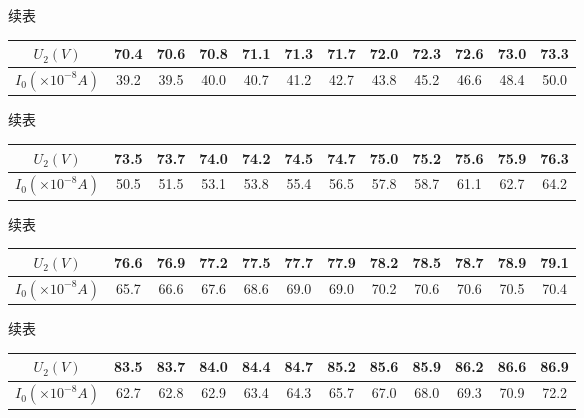 \documentclass{article}
\begin{document}
    续表

    \begin{center}
        \begin{tabular}{|c|c|c|c|c|c|c|c|c|c|c|c|}
            \hline
            $U_2(V)$ & 70.4  & 70.6  & 70.8  & 71.1  & 71.3  & 71.7  & 72.0  & 72.3  & 72.6  & 73.0  & 73.3  \bigstrut\\
            \hline
            $I_0(\times 10^{-8}A)$ & 39.2  & 39.5  & 40.0  & 40.7  & 41.2  & 42.7  & 43.8  & 45.2  & 46.6  & 48.4  & 50.0  \bigstrut\\
            \hline
        \end{tabular}%
    \end{center}

    续表

    \begin{center}
        \begin{tabular}{|c|c|c|c|c|c|c|c|c|c|c|c|}
            \hline
            $U_2(V)$ & 73.5  & 73.7  & 74.0  & 74.2  & 74.5  & 74.7  & 75.0  & 75.2  & 75.6  & 75.9  & 76.3  \bigstrut\\
            \hline
            $I_0(\times 10^{-8}A)$ & 50.5  & 51.5  & 53.1  & 53.8  & 55.4  & 56.5  & 57.8  & 58.7  & 61.1  & 62.7  & 64.2  \bigstrut\\
            \hline
        \end{tabular}%
    \end{center}

    续表

    \begin{center}
        \begin{tabular}{|c|c|c|c|c|c|c|c|c|c|c|c|}
            \hline
            $U_2(V)$ & 76.6  & 76.9  & 77.2  & 77.5  & 77.7  & 77.9  & 78.2  & 78.5  & 78.7  & 78.9  & 79.1  \bigstrut\\
            \hline
            $I_0(\times 10^{-8}A)$ & 65.7  & 66.6  & 67.6  & 68.6  & 69.0  & 69.0  & 70.2  & 70.6  & 70.6  & 70.5  & 70.4  \bigstrut\\
            \hline
        \end{tabular}%
    \end{center}

    续表

    \begin{center}
        \begin{tabular}{|c|c|c|c|c|c|c|c|c|c|c|c|}
            \hline
            $U_2(V)$ & 83.5  & 83.7  & 84.0  & 84.4  & 84.7  & 85.2  & 85.6  & 85.9  & 86.2  & 86.6  & 86.9  \bigstrut\\
            \hline
            $I_0(\times 10^{-8}A)$ & 62.7  & 62.8  & 62.9  & 63.4  & 64.3  & 65.7  & 67.0  & 68.0  & 69.3  & 70.9  & 72.2  \bigstrut\\
            \hline
        \end{tabular}%
    \end{center}
\end{document}
